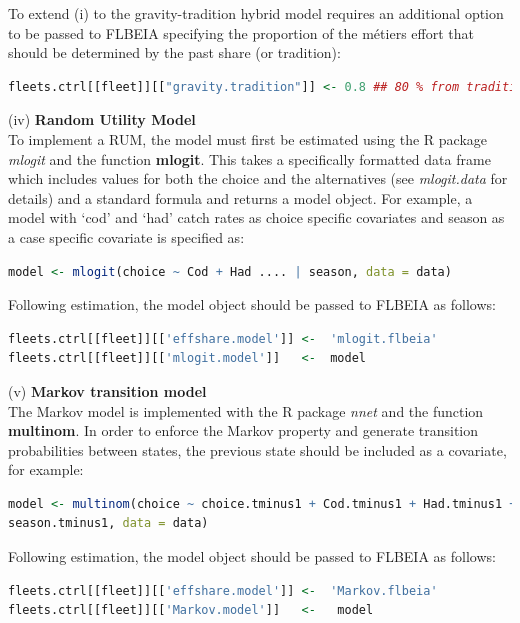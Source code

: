 \documentclass[12pt, halfline, a4paper]{ouparticle}
\begin{document}
To extend (i) to the gravity-tradition hybrid model requires an additional
option to be passed to FLBEIA specifying the proportion of the métiers effort
that should be determined by the past share (or tradition):

\begin{lstlisting}[language=R]
fleets.ctrl[[fleet]][["gravity.tradition"]] <- 0.8 ## 80 % from tradition
\end{lstlisting}

(iv) \textbf{Random Utility Model} \\

To implement a RUM, the model must first be estimated using the R package
\textit{mlogit} \citep{Croissant2019} and the function \textbf{mlogit}. This
takes a specifically formatted data frame which includes values for both the
choice and the alternatives (see \textit{mlogit.data} for details) and a
standard formula and returns a model object. For example, a model with `cod'
and `had' catch rates as choice specific covariates and season as a case
specific covariate is specified as:

\begin{lstlisting}[language=R]
model <- mlogit(choice ~ Cod + Had .... | season, data = data)
\end{lstlisting}


Following estimation, the model object should be passed to FLBEIA as follows:

\begin{lstlisting}[language=R]
fleets.ctrl[[fleet]][['effshare.model']] <-  'mlogit.flbeia'
fleets.ctrl[[fleet]][['mlogit.model']]   <-  model 
\end{lstlisting}

(v) \textbf{Markov transition model} \\

The Markov model is implemented with the R package \textit{nnet} and the
function \textbf{multinom}. In order to enforce the Markov property and
generate transition probabilities between states, the previous state should be
included as a covariate, for example:

\begin{lstlisting}[language=R]
model <- multinom(choice ~ choice.tminus1 + Cod.tminus1 + Had.tminus1 +
season.tminus1, data = data)
\end{lstlisting}

Following estimation, the model object should be passed to FLBEIA as follows:

\begin{lstlisting}[language=R]
fleets.ctrl[[fleet]][['effshare.model']] <-  'Markov.flbeia'
fleets.ctrl[[fleet]][['Markov.model']]   <-   model 
\end{lstlisting}
\end{document}
